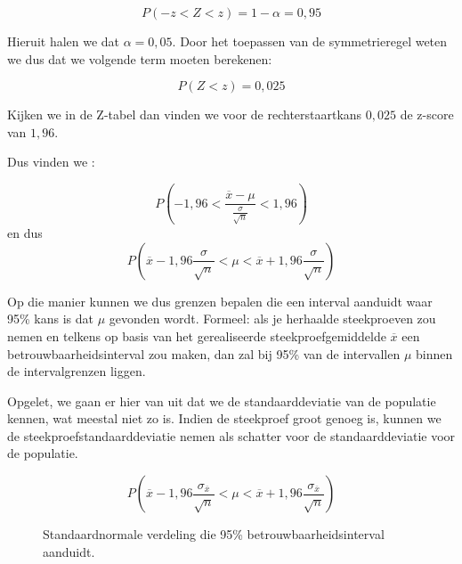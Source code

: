 {\[P(-z < Z < z) = 1 - \alpha = 0,95 \]

Hieruit halen we dat $\alpha = 0,05$. Door het toepassen van de symmetrieregel weten we dus dat we volgende term moeten berekenen:

\[ P( Z < z) = 0,025 \]

Kijken we in de Z-tabel dan vinden we voor de rechterstaartkans $0,025$ de z-score van $1,96$.

Dus vinden we :

\[ P( -1,96 < \frac{\overline{x} - \mu}{\frac{\sigma}{\sqrt{n}}} < 1,96 ) \]
en dus
\[ P ( \overline{x} -1,96 \frac{\sigma}{\sqrt{n}} <\mu < \overline{x} + 1,96 \frac{\sigma}{\sqrt{n}}) \]

Op die manier kunnen we dus grenzen bepalen die een interval aanduidt waar 95\% kans is dat $\mu$ gevonden wordt. Formeel: als je herhaalde steekproeven zou nemen en telkens op basis van het gerealiseerde steekproefgemiddelde $\overline{x}$ een betrouwbaarheidsinterval zou maken, dan zal bij 95\% van de intervallen $\mu$ binnen de intervalgrenzen liggen.

Opgelet, we gaan er hier van uit dat we de standaarddeviatie van de populatie kennen, wat meestal niet zo is. Indien de steekproef groot genoeg is, kunnen we de steekproefstandaarddeviatie nemen als schatter voor de standaarddeviatie voor de populatie.

\[ P ( \overline{x} -1,96 \frac{\sigma_{\overline{x}}}{\sqrt{n}} < \mu < \overline{x} + 1,96 \frac{\sigma_{\overline{x}}}{\sqrt{n}}) \]


\begin{figure}[t]
\centering
{}
\caption{Standaardnormale verdeling die 95\% betrouwbaarheidsinterval aanduidt.}
\label{fig:verdelingStandaardnormaal}
\end{figure}

}
